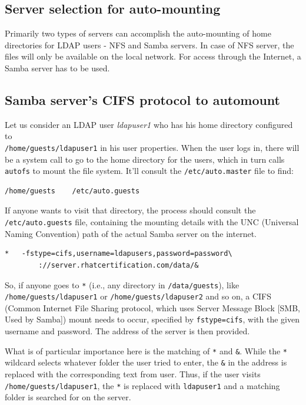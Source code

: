 \subsection{Server selection for auto-mounting}
Primarily two types of servers can accomplish the auto-mounting of home directories for LDAP users - NFS and Samba servers. In case of NFS server, the files will only be available on the local network. For access through the Internet, a Samba server has to be used. 

\subsection{Samba server's CIFS protocol to automount}
Let us consider an LDAP user \textit{ldapuser1} who has his home directory configured to \\\verb|/home/guests/ldapuser1| in his user properties. When the user logs in, there will be a system call to go to the home directory for the users, which in turn calls \verb|autofs| to mount the file system. It'll consult the \verb|/etc/auto.master| file to find:

\begin{verbatim}
/home/guests	/etc/auto.guests
\end{verbatim}

\noindent
If anyone wants to visit that directory, the process should consult the \verb|/etc/auto.guests| file, containing the mounting details with the UNC (Universal Naming Convention) path of the actual Samba server on the internet. 

\begin{verbatim}
*	-fstype=cifs,username=ldapusers,password=password\ 
		://server.rhatcertification.com/data/&
\end{verbatim}

\noindent
So, if anyone goes to \verb|*| (i.e., any directory in \verb|/data/guests|), like \verb|/home/guests/ldapuser1| or \verb|/home/guests/ldapuser2| and so on, a CIFS (Common Internet File Sharing protocol, which uses Server Message Block [SMB, Used by Samba]) mount needs to occur, specified by \verb|fstype=cifs|, with the given username and password. The address of the server is then provided. 

What is of particular importance here is the matching of \verb|*| and \verb|&|. While the \verb|*| wildcard selects whatever folder the user tried to enter, the \verb|&| in the address is replaced with the corresponding text from user. Thus, if the user visits \verb|/home/guests/ldapuser1|, the \verb|*| is replaced with \verb|ldapuser1| and a matching folder is searched for on the server. 

